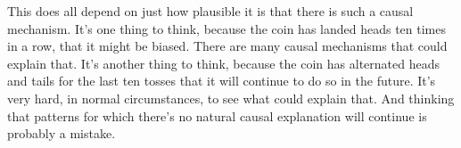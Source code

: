 This does all depend on just how plausible it is that there is such a causal mechanism. It's one thing to think, because the coin has landed heads ten times in a row, that it might be biased. There are many causal mechanisms that could explain that. It's another thing to think, because the coin has alternated heads and tails for the last ten tosses that it will continue to do so in the future. It's very hard, in normal circumstances, to see what could explain that. And thinking that patterns for which there's no natural causal explanation will continue is probably a mistake.
%
%
%
%
%
